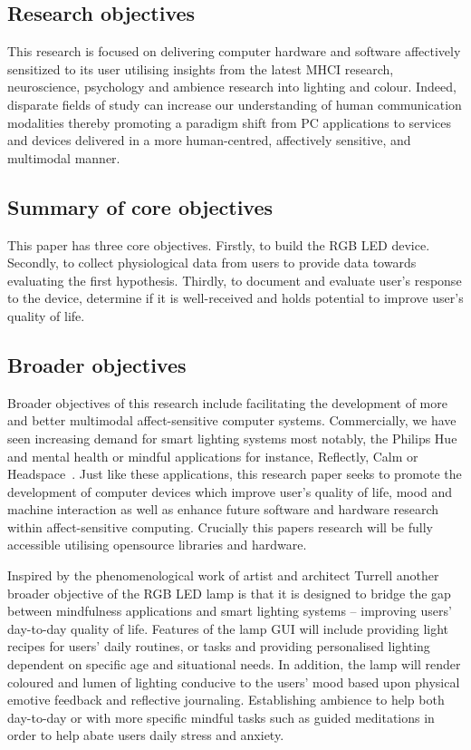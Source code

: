 \documentclass{sigchi}
\begin{document}
\subsection{Research objectives}

This research is focused on delivering computer hardware and software affectively sensitized to its user utilising insights from the latest MHCI research, neuroscience, psychology and ambience research into lighting and colour. Indeed, disparate fields of study can increase our understanding of human communication modalities thereby promoting a paradigm shift from PC applications to services and devices delivered in a more human-centred, affectively sensitive, and multimodal manner. 

\subsection{Summary of core objectives}

This paper has three core objectives. Firstly, to build the RGB LED device. Secondly, to collect physiological data from users to provide data towards evaluating the first hypothesis. Thirdly, to document and evaluate user’s response to the device, determine if it is well-received and holds potential to improve user’s quality of life.

\subsection{Broader objectives}

Broader objectives of this research include facilitating the development of more and better multimodal affect-sensitive computer systems. Commercially, we have seen increasing demand for smart lighting systems most notably, the Philips Hue~\cite{Phillips01} and mental health or mindful applications for instance, Reflectly, Calm or Headspace~\cite{Reflectly01}. Just like these applications, this research paper seeks to promote the development of computer devices which improve user’s quality of life, mood and machine interaction as well as enhance future software and hardware research within affect-sensitive computing. Crucially this papers research will be fully accessible utilising opensource libraries and hardware. 

Inspired by the phenomenological work of artist and architect Turrell another broader objective of the RGB LED lamp is that it is designed to bridge the gap between mindfulness applications and smart lighting systems – improving users’ day-to-day quality of life. Features of the lamp GUI will include providing light recipes for users’ daily routines, or tasks and providing personalised lighting dependent on specific age and situational needs. In addition, the lamp will render coloured and lumen of lighting conducive to the users’ mood based upon physical emotive feedback and reflective journaling. Establishing ambience to help both day-to-day or with more specific mindful tasks such as guided meditations in order to help abate users daily stress and anxiety.
\end{document}
